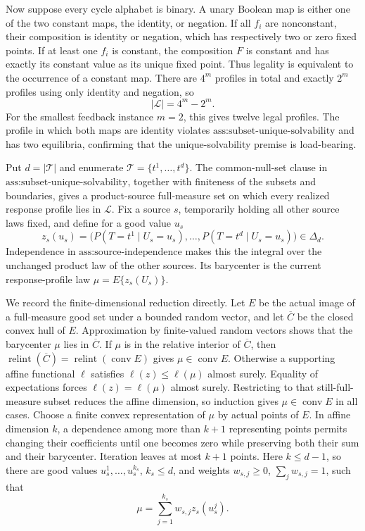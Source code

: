 Now suppose every cycle alphabet is binary.  A unary Boolean map is either one of the two constant maps, the identity, or negation.  If all \(f_i\) are nonconstant, their composition is identity or negation, which has respectively two or zero fixed points.  If at least one \(f_i\) is constant, the composition \(F\) is constant and has exactly its constant value as its unique fixed point.  Thus legality is equivalent to the occurrence of a constant map.  There are \(4^m\) profiles in total and exactly \(2^m\) profiles using only identity and negation, so
\[
 |\mathcal L|=4^m-2^m.
\]
For the smallest feedback instance \(m=2\), this gives twelve legal profiles.  The profile in which both maps are identity violates \(\text{ass:subset-unique-solvability}\) and has two equilibria, confirming that the unique-solvability premise is load-bearing.

Put \(d=|\mathcal T|\) and enumerate \(\mathcal T=\{t^1,\ldots,t^d\}\).  The common-null-set clause in \(\text{ass:subset-unique-solvability}\), together with finiteness of the subsets and boundaries, gives a product-source full-measure set on which every realized response profile lies in \(\mathcal L\).  Fix a source \(s\), temporarily holding all other source laws fixed, and define for a good value \(u_s\)
\[
 z_s(u_s)=\bigl(P(T=t^1\mid U_s=u_s),\ldots,P(T=t^d\mid U_s=u_s)\bigr)\in\Delta_d.
\]
Independence in \(\text{ass:source-independence}\) makes this the integral over the unchanged product law of the other sources.  Its barycenter is the current response-profile law \(\mu=E\{z_s(U_s)\}\).

We record the finite-dimensional reduction directly.  Let \(E\) be the actual image of a full-measure good set under a bounded random vector, and let \(\overline C\) be the closed convex hull of \(E\).  Approximation by finite-valued random vectors shows that the barycenter \(\mu\) lies in \(\overline C\).  If \(\mu\) is in the relative interior of \(\overline C\), then \(\operatorname{relint}(\overline C)=\operatorname{relint}(\operatorname{conv}E)\) gives \(\mu\in\operatorname{conv}E\).  Otherwise a supporting affine functional \(\ell\) satisfies \(\ell(z)\le\ell(\mu)\) almost surely.  Equality of expectations forces \(\ell(z)=\ell(\mu)\) almost surely.  Restricting to that still-full-measure subset reduces the affine dimension, so induction gives \(\mu\in\operatorname{conv}E\) in all cases.  Choose a finite convex representation of \(\mu\) by actual points of \(E\).  In affine dimension \(k\), a dependence among more than \(k+1\) representing points permits changing their coefficients until one becomes zero while preserving both their sum and their barycenter.  Iteration leaves at most \(k+1\) points.  Here \(k\le d-1\), so there are good values \(u_s^1,\ldots,u_s^{k_s}\), \(k_s\le d\), and weights \(w_{s,j}\ge0\), \(\sum_jw_{s,j}=1\), such that
\[
 \mu=\sum_{j=1}^{k_s}w_{s,j}z_s(u_s^j).
\]

